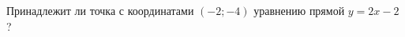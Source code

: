 \begin{ex}
	\begin{condition}
		Принадлежит ли точка с координатами \( (-2;-4) \) уравнению прямой \( y=2x-2 \)?
	\end{condition}
\end{ex}